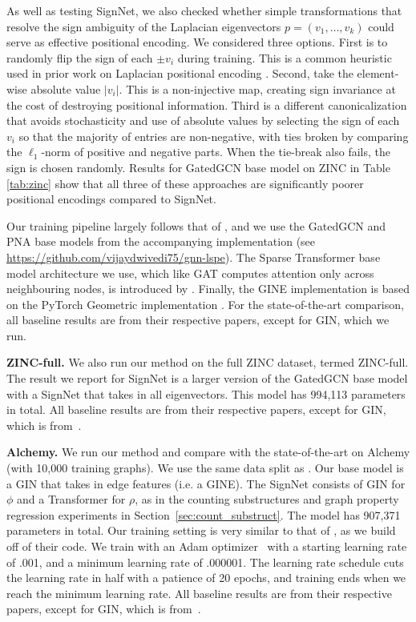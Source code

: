 \documentclass{article} \usepackage{iclr2023_conference,times}
\begin{document}
As well as testing SignNet,  we also checked whether simple transformations that resolve the sign ambiguity of the Laplacian eigenvectors $p=(v_1, \ldots , v_k)$ could serve as effective positional encoding. We considered three options. First is to randomly flip the sign of each $\pm v_i$ during training. This is a common heuristic used in prior work on Laplacian positional encoding \citep{kreuzer2021rethinking,dwivedi2020benchmarking}. Second,  take the element-wise absolute value $|v_i|$. This is a non-injective map, creating sign invariance at the cost of destroying positional information. Third is a different canonicalization that avoids stochasticity and use of  absolute values by selecting the sign of each $v_i$ so that the majority of entries are non-negative, with ties broken by comparing the $\ell_1$-norm of positive and negative parts. When the tie-break also fails, the sign is chosen randomly. Results for GatedGCN base model on ZINC in Table \ref{tab:zinc} show that all three of these approaches are  significantly  poorer positional encodings compared to SignNet. 

Our training pipeline largely follows that of \cite{dwivedi2022graph}, and we use the GatedGCN and PNA base models from the accompanying implementation (see \url{https://github.com/vijaydwivedi75/gnn-lspe}). The Sparse Transformer base model architecture we use, which like GAT computes attention only across neighbouring nodes, is introduced by \cite{kreuzer2021rethinking}. Finally, the GINE implementation is based on the PyTorch Geometric implementation \citep{fey2019fast}. For the state-of-the-art comparison, all baseline results are from their respective papers, except for GIN, which we run.

\textbf{ZINC-full.} We also run our method on the full ZINC dataset, termed ZINC-full. The result we report for SignNet is a larger version of the GatedGCN base model with a SignNet that takes in all eigenvectors. This model has 994,113 parameters in total. All baseline results are from their respective papers, except for GIN, which is from~\citep{bodnar2021weisfeiler}.

\textbf{Alchemy.} We run our method and compare with the state-of-the-art on Alchemy (with 10,000 training graphs). We use the same data split as \citet{morris2020weisfeiler}.  Our base model is a GIN that takes in edge features (i.e. a GINE). The SignNet consists of GIN for $\phi$ and a Transformer for $\rho$, as in the counting substructures and graph property regression experiments in Section~\ref{sec:count_substruct}. The model has 907,371 parameters in total. Our training setting is very similar to that of \cite{morris2022speqnets}, as we build off of their code. We train with an Adam optimizer~\citep{kingma2014adam} with a starting learning rate of .001, and a minimum learning rate of .000001. The learning rate schedule cuts the learning rate in half with a patience of 20 epochs, and training ends when we reach the minimum learning rate. All baseline results are from their respective papers, except for GIN, which is from~\citep{morris2022speqnets}.
\end{document}

